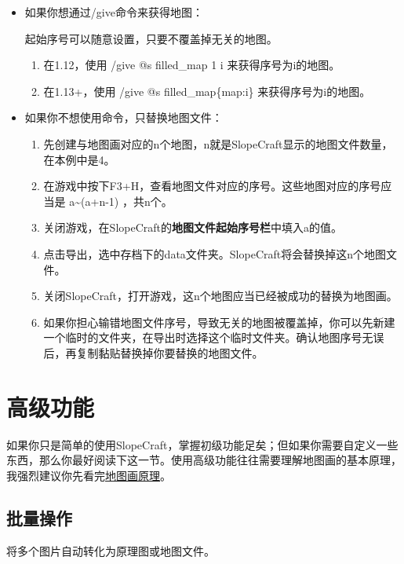 \documentclass[UTF8]{ctexart}
\begin{document}
\begin{itemize}
    \item 如果你想通过/give命令来获得地图：

          起始序号可以随意设置，只要不覆盖掉无关的地图。
          \begin{enumerate}
              \item 在1.12，使用 /give @s filled\_map 1 i 来获得序号为i的地图。
              \item 在1.13+，使用 /give @s filled\_map\{map:i\} 来获得序号为i的地图。
          \end{enumerate}
    \item 如果你不想使用命令，只替换地图文件：
          \begin{enumerate}
              \item 先创建与地图画对应的n个地图，n就是SlopeCraft显示的地图文件数量，在本例中是4。
              \item 在游戏中按下F3+H，查看地图文件对应的序号。这些地图对应的序号应当是 a\textasciitilde(a+n-1) ，共n个。
              \item 关闭游戏，在SlopeCraft的\textbf{地图文件起始序号栏}中填入a的值。
              \item 点击导出，选中存档下的data文件夹。SlopeCraft将会替换掉这n个地图文件。
              \item 关闭SlopeCraft，打开游戏，这n个地图应当已经被成功的替换为地图画。
              \item 如果你担心输错地图文件序号，导致无关的地图被覆盖掉，你可以先新建一个临时的文件夹，在导出时选择这个临时文件夹。确认地图序号无误后，再复制黏贴替换掉你要替换的地图文件。
          \end{enumerate}
\end{itemize}

\pagebreak
\section{高级功能}
如果你只是简单的使用SlopeCraft，掌握初级功能足矣；但如果你需要自定义一些东西，那么你最好阅读下这一节。使用高级功能往往需要理解地图画的基本原理，我强烈建议你先看完\href{https://github.com/ToKiNoBug/SlopeCraftTutorial/blob/main/BasicPrinciple/Principle%20of%20map%20pixel%20arts.md}{地图画原理}。

\subsection{批量操作}
\label{BatchOp}
将多个图片自动转化为原理图或地图文件。
\end{document}
